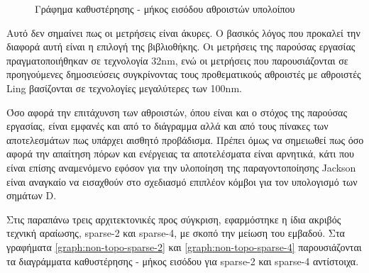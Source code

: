 \begin{figure}[H]
\begin{center}
\end{center}
\caption{Γράφημα καθυστέρησης - μήκος εισόδου αθροιστών υπολοίπου}   
\label{graph:non-topo}
\end{figure}

Αυτό δεν σημαίνει πως οι μετρήσεις είναι άκυρες. Ο βασικός λόγος που προκαλεί την διαφορά αυτή είναι η επιλογή της βιβλιοθήκης. Οι μετρήσεις της παρούσας εργασίας πραγματοποιήθηκαν σε τεχνολογία 32nm, ενώ οι μετρήσεις που παρουσιάζονται σε προηγούμενες δημοσιεύσεις συγκρίνοντας τους προθεματικούς αθροιστές με αθροιστές Ling βασίζονται σε τεχνολογίες μεγαλύτερες των 100nm. 

Όσο αφορά την επιτάχυνση των αθροιστών, όπου είναι και ο στόχος της παρούσας εργασίας, είναι εμφανές και από το διάγραμμα αλλά και από τους πίνακες των αποτελεσμάτων πως υπάρχει αισθητό προβάδισμα. Πρέπει όμως να σημειωθεί πως όσο αφορά την απαίτηση πόρων και ενέργειας τα αποτελέσματα είναι αρνητικά, κάτι που είναι επίσης αναμενόμενο εφόσον για την υλοποίηση της παραγοντοποίησης Jackson είναι αναγκαίο να εισαχθούν στο σχεδιασμό επιπλέον κόμβοι για τον υπολογισμό των σημάτων D.

Στις παραπάνω τρεις αρχιτεκτονικές προς σύγκριση, εφαρμόστηκε η ίδια ακριβός τεχνική αραίωσης, sparse-2 και sparse-4, με σκοπό την μείωση του εμβαδού. Στα γραφήματα \ref{graph:non-topo-sparse-2} και \ref{graph:non-topo-sparse-4} παρουσιάζονται τα διαγράμματα καθυστέρησης - μήκος εισόδου για sparse-2 και sparse-4 αντίστοιχα.

